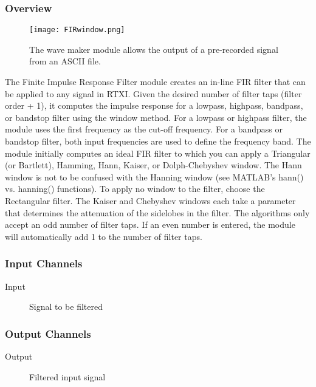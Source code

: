 
\subsubsection{Overview}
\label{FIR Filter}

\begin{figure}[h]
\begin{center}
\texttt{[image: FIRwindow.png]} 
\caption[firfilter]{The wave maker module allows the output of a pre-recorded signal from an ASCII file.} 
\end{center}
\label{firfilter}
\end{figure}

The Finite Impulse Response Filter module creates an in-line FIR filter that can be applied to any signal in RTXI. Given the desired number of filter taps (filter order + 1), it computes the impulse response for a lowpass, highpass, bandpass, or bandstop filter using the window method. For a lowpass or highpass filter, the module uses the first frequency as the cut-off frequency. For a bandpass or bandstop filter, both input frequencies are used to define the frequency band. The module initially computes an ideal FIR filter to which you can apply a Triangular (or Bartlett), Hamming, Hann, Kaiser, or Dolph-Chebyshev window. The Hann window is not to be confused with the Hanning window (see MATLAB’s hann() vs. hanning() functions). To apply no window to the filter, choose the Rectangular filter. The Kaiser and Chebyshev windows each take a parameter that determines the attenuation of the sidelobes in the filter. The algorithms only accept an odd number of filter taps. If an even number is entered, the module will automatically add 1 to the number of filter taps.

\subsubsection{Input Channels}
\begin{description}
\item [Input]Signal to be filtered
\end{description}

\subsubsection{Output Channels}
\begin{description}
\item [Output]Filtered input signal
\end{description}

